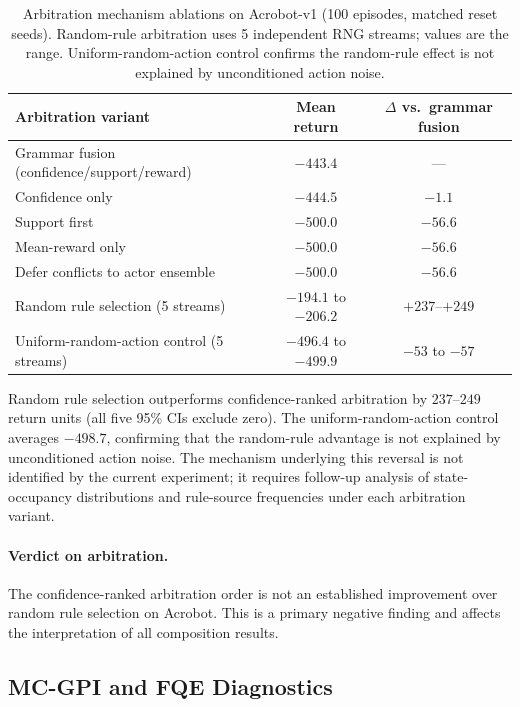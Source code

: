 \documentclass[12pt]{article}
\begin{document}
\begin{table}[t]
\centering
\caption{Arbitration mechanism ablations on Acrobot-v1 (100 episodes,
  matched reset seeds). Random-rule arbitration uses 5 independent RNG
  streams; values are the range.
  Uniform-random-action control confirms the random-rule effect is not
  explained by unconditioned action noise.}
\label{tab:arbitration}
\begin{tabular}{lcc}
\toprule
Arbitration variant & Mean return & $\Delta$ vs.\ grammar fusion \\
\midrule
Grammar fusion (confidence/support/reward)  & $-443.4$ & --- \\
Confidence only                             & $-444.5$ & $-1.1$ \\
Support first                               & $-500.0$ & $-56.6$ \\
Mean-reward only                            & $-500.0$ & $-56.6$ \\
Defer conflicts to actor ensemble           & $-500.0$ & $-56.6$ \\
Random rule selection (5 streams)           & $-194.1$ to $-206.2$ & $+237$--$+249$ \\
\midrule
Uniform-random-action control (5 streams)   & $-496.4$ to $-499.9$ & $-53$ to $-57$ \\
\bottomrule
\end{tabular}
\end{table}

Random rule selection outperforms confidence-ranked arbitration by
$237$--$249$ return units (all five 95\% CIs exclude zero).
The uniform-random-action control averages $-498.7$, confirming that
the random-rule advantage is not explained by unconditioned action noise.
The mechanism underlying this reversal is not identified by the current
experiment; it requires follow-up analysis of state-occupancy distributions
and rule-source frequencies under each arbitration variant.

\paragraph{Verdict on arbitration.}
The confidence-ranked arbitration order is not an established improvement
over random rule selection on Acrobot.
This is a primary negative finding and affects the interpretation of
all composition results.

\subsection{MC-GPI and FQE Diagnostics}
\label{sec:results:gpi}
\end{document}
